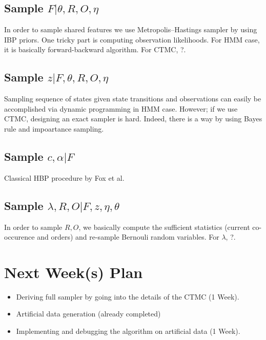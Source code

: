\documentclass{article}
\begin{document}
\subsection{Sample $F|\theta,R,O,\eta$}
In order to sample shared features we use Metropolis–Hastings sampler by using IBP priors. One tricky part is computing observation likelihoods. For HMM case, it is basically forward-backward algorithm. For CTMC, ?.
\subsection{Sample $z|F,\theta,R,O,\eta$}
Sampling sequence of states given state transitions and observations can easily be accomplished via dynamic programming in HMM case. However; if we use CTMC,  designing an exact sampler is hard. Indeed, there is a way by using Bayes rule and impoartance sampling.
\subsection{Sample $c,\alpha|F$}
Classical HBP procedure by Fox et al\cite{fox}.
\subsection{Sample $\lambda,R,O|F,z,\eta,\theta$}
In order to sample $R,O$, we basically compute the sufficient statistics (current co-occurence and orders) and re-sample Bernouli random variables. For $\lambda$, ?.

\section{Next Week(s) Plan}
\begin{itemize}
  \item Deriving full sampler by going into the details of the CTMC (1 Week).
  \item Artificial data generation (already completed)
  \item Implementing and debugging the algorithm on artificial data (1 Week).
\end{itemize}
\end{document}

